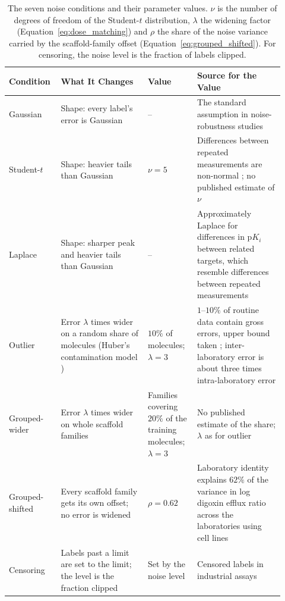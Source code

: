 \begin{table}[htbp]
\centering
\small
\begin{adjustbox}{max width=\textwidth,max totalheight=0.78\textheight}
\begin{tabular}{@{}P{0.15\linewidth}P{0.30\linewidth}P{0.17\linewidth}P{0.30\linewidth}@{}}
\toprule
\textbf{Condition} & \textbf{What It Changes} & \textbf{Value} & \textbf{Source for the Value} \\
\midrule
Gaussian & Shape: every label's error is Gaussian & -- & The standard assumption in noise-robustness studies \\
Student-$t$ & Shape: heavier tails than Gaussian & $\nu = 5$ & Differences between repeated measurements are non-normal \citep{Kruger2012}; no published estimate of $\nu$ \\
Laplace & Shape: sharper peak and heavier tails than Gaussian & -- & Approximately Laplace for differences in p$K_i$ between related targets, which resemble differences between repeated measurements \citep{Kruger2012} \\
Outlier & Error $\lambda$ times wider on a random share of molecules (Huber's contamination model \citep{Huber1964}) & $10\%$ of molecules; $\lambda = 3$ & $1$--$10\%$ of routine data contain gross errors, upper bound taken \citep{Hampel2001}; inter-laboratory error is about three times intra-laboratory error \citep{Avdeef2019} \\
Grouped-wider & Error $\lambda$ times wider on whole scaffold families & Families covering $20\%$ of the training molecules; $\lambda = 3$ & No published estimate of the share; $\lambda$ as for outlier \citep{Avdeef2019} \\
Grouped-shifted & Every scaffold family gets its own offset; no error is widened & $\rho = 0.62$ & Laboratory identity explains $62\%$ of the variance in log digoxin efflux ratio across the laboratories using cell lines \citep{Bentz2013} \\
Censoring & Labels past a limit are set to the limit; the level is the fraction clipped & Set by the noise level & Censored labels in industrial assays \citep{Svensson2025} \\
\bottomrule
\end{tabular}
\end{adjustbox}
\caption[The seven noise conditions and their parameters.]{The seven noise conditions and their parameter values. $\nu$ is the number of degrees of freedom of the Student-$t$ distribution, $\lambda$ the widening factor (Equation~\ref{eq:dose_matching}) and $\rho$ the share of the noise variance carried by the scaffold-family offset (Equation~\ref{eq:grouped_shifted}). For censoring, the noise level is the fraction of labels clipped.}
\label{tab:noise_conditions}
\end{table}


